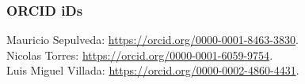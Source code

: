 \documentclass[11pt,a4paper]{article}
\begin{document}
\subsubsection*{ORCID iDs}
Mauricio Sepulveda: \href{https://orcid.org/0000-0001-8463-3830}{https://orcid.org/0000-0001-8463-3830}.\\
Nicolas Torres: \href{https://orcid.org/0000-0001-6059-9754}{https://orcid.org/0000-0001-6059-9754}.\\
Luis Miguel Villada: \href{https://orcid.org/0000-0002-4860-4431}{https://orcid.org/0000-0002-4860-4431}.

\typeout{}


\end{document}
